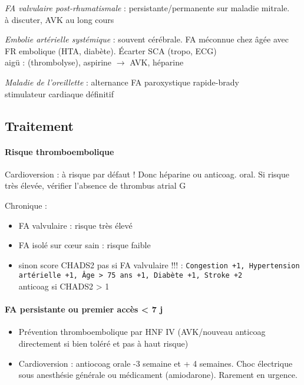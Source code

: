 \documentclass{article}
\def\arrow{$\rightarrow$}
\begin{document}
\textit{FA valvulaire post-rhumatismale}  : persistante/permanente sur maladie
mitrale. \\
\hspace*{10pt}\thus à discuter, AVK au long cours

\textit{Embolie artérielle systémique} : souvent cérébrale. FA méconnue chez
\female{} âgée avec FR embolique (HTA, diabète). Écarter SCA (tropo, ECG)\\
\hspace*{10pt}\thus aigü : (thrombolyse), aspirine \arrow{} AVK, héparine

\textit{Maladie de l'oreillette}  : alternance FA paroxystique rapide-brady\\
\hspace*{10pt}\thus stimulateur cardiaque définitif

\subsection{Traitement}
\paragraph{Risque thromboembolique}
Cardioversion : à risque par défaut ! Donc héparine ou anticoag. oral. 
Si risque très élevée, vérifier l'absence de thrombus atrial G

Chronique :
\begin{itemize}
  \item FA valvulaire : risque très élevé
  \item FA isolé sur c\oe{}ur sain : risque faible
  \item sinon score CHADS2 \danger{} pas si FA valvulaire !!! : \texttt{Congestion +1,
    Hypertension artérielle +1, Âge > 75 ans +1, Diabète +1, Stroke +2}\\
    anticoag si CHADS2 > 1
\end{itemize}

\paragraph{FA persistante ou premier accès < 7 j}
\begin{itemize}
  \item Prévention thromboembolique par HNF IV (AVK/nouveau anticoag
    directement si bien toléré et pas à haut risque)
  \item Cardioversion : antiocoag orale -3 semaine et + 4 semaines. Choc
    électrique sous anesthésie générale ou médicament (amiodarone). Rarement en
    urgence.
\end{itemize}
\end{document}
